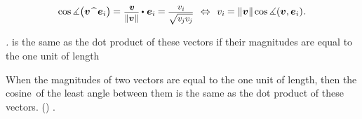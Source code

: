 \nopagebreak\vspace{-0.2em}\begin{equation}\label{anglesbetweenvectorandbasisvectors}
\operatorname{cos} \measuredangle \bigl( \bm{v} \widehat{\phantom{w}} \bm{e}_i \bigr) %
\hspace{-0.1ex}
= \scalebox{.9}{$ \displaystyle\frac{\hspace{.2ex}\raisemath{-0.16em}{\bm{v}}}{\raisemath{-0.05em}{\|\bm{v}\|}} $} \hspace{-0.1ex} \dotp \hspace{.1ex} \bm{e}_i \hspace{-0.1ex}
= \hspace{-0.1ex}\scalebox{.9}{$ \displaystyle\frac{\hspace{.2ex}\raisemath{-0.12em}{v_i}}{\raisemath{-0.1em}{\sqrt{\vphantom{i} v_{\hspace{-0.1ex}j} v_{\hspace{-0.1ex}j}}}} $}
\hspace{.4em}\Leftrightarrow\hspace{.4em}
\tikzmark{beginComponentOfVectorThruLengthAndCosine} v_i \hspace{.3ex} \tikzmark{endComponentOfVectorThruLengthAndCosine} \hspace{-0.4ex} = \|\bm{v}\| \hspace{-0.1ex} \operatorname{cos} \measuredangle ({\bm{v}, \bm{e}_i})
\hspace{.1ex} .
\end{equation}%
%
{}
\vspace{-0.6em}

\emph{.}
is the same as the dot product of these vectors
if their magnitudes are equal to the one unit of length

When the magnitudes of two vectors
are equal to the one unit of length,
then the cosine of the least angle between them
is the same as the dot product of these vectors.
()
.


